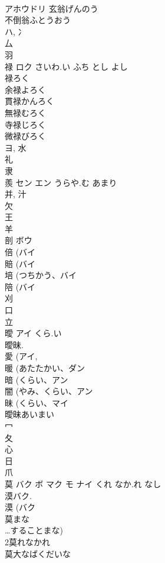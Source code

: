 \documentclass[8pt]{extreport}
\begin{document}
\begin{CJK}{UTF8}{min}
\\	アホウドリ 玄翁げんのう 
\\	不倒翁ふとうおう 
\\	ハ, 冫 
\\	厶 
\\	羽 
\\	禄	ロク	さいわ.い ふち とし よし	
\\	禄ろく 
\\	余禄よろく 
\\	貫禄かんろく 
\\	無禄むろく 
\\	寺禄じろく 
\\	微禄びろく 
\\	ヨ, 水 
\\	礼 
\\	隶 
\\	羨	セン エン	うらや.む あまり	
\\	并, 汁 
\\	欠 
\\	王 
\\	羊 
\\	剖	ボウ		
\\	倍 (バイ 
\\	賠 (バイ 
\\	培 (つちかう、バイ 
\\	陪 (バイ 
\\	刈 
\\	口 
\\	立 
\\	曖	アイ	くら.い	
\\	曖昧. 
\\	愛 (アイ, 
\\	暖 (あたたかい、ダン 
\\	暗 (くらい、アン 
\\	闇 (やみ、くらい、アン 
\\	昧 (くらい、マイ 
\\	曖昧あいまい
\\	冖 
\\	夂 
\\	心 
\\	日 
\\	爪 
\\	莫	バク ボ マク モ ナイ	くれ なか.れ なし	
\\	漠バク. 
\\	漠 (バク 
\\	莫まな
\\	…することまな) 
\\	2莫れなかれ
\\	莫大なばくだいな

\end{CJK}
\end{document}
